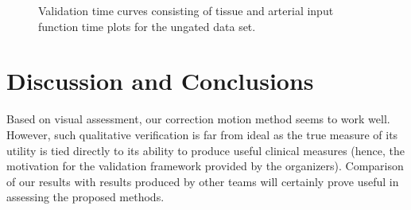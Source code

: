 \documentclass{llncs}
\begin{document}
    
\begin{figure}
  \caption{Validation time curves consisting of tissue and arterial input function time plots 
  for the ungated data set.}
  \label{fig:ungated}
\end{figure}


\section{Discussion and Conclusions}
Based on visual assessment, our correction motion method seems to work
well. However, such qualitative verification is far from ideal as the
true measure of its utility is tied directly to its ability to produce useful
clinical measures (hence, the motivation for the validation framework provided 
by the organizers).  Comparison of our results with results produced by other 
teams will certainly prove useful in assessing the proposed methods. 
\end{document}
